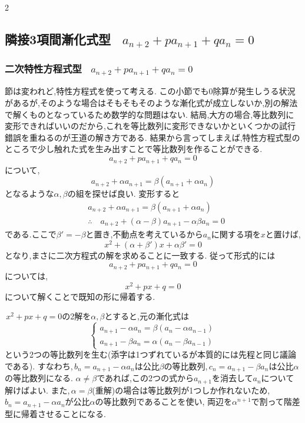 \documentclass[dvipdfmx,a4paper,11pt,fleqn,openany]{jsbook}
\begin{document}
\begin{multicols*}{2}
\begin{quote}
    \end{quote}

  \subsection{隣接3項間漸化式型 \, $\displaystyle a_{n+2}+pa_{n+1}+qa_n=0$}
    \subsubsection{二次特性方程式型 \, $\displaystyle a_{n+2}+pa_{n+1}+qa_n=0$}
      節は変われど,特性方程式を使って考える.
      この小節でも0除算が発生しうる状況があるが,そのような場合はそもそもそのような漸化式が成立しないか,別の解法で解くものとなっているため数学的な問題はない.
      結局,大方の場合,等比数列に変形できればいいのだから,これを等比数列に変形できないかといくつかの試行錯誤を重ねるのが王道の解き方である.
      結果から言ってしまえば,特性方程式型のところで少し触れた式を生み出すことで等比数列を作ることができる.
      \[
        a_{n+2}+pa_{n+1}+qa_n=0
      \]
      について,
      \[
        a_{n+2}+\alpha a_{n+1}=\beta(a_{n+1}+\alpha a_{n})
      \]
      となるような$\alpha,\beta$の組を探せば良い.
      変形すると
      \begin{align*}
        &a_{n+2}+\alpha a_{n+1}=\beta(a_{n+1}+\alpha a_{n})\\
        &\therefore \quad a_{n+2}+(\alpha-\beta)a_{n+1}-\alpha\beta a_n=0
      \end{align*}
      である.ここで$\beta'=-\beta$と置き,不動点を考えているから$a_n$に関する項を$x$と置けば,
      \[
        x^2+(\alpha+\beta')x+\alpha\beta'=0      
      \]
      となり,まさに二次方程式の解を求めることに一致する.
      従って形式的には
      \[
        a_{n+2}+pa_{n+1}+qa_n=0
      \]
      については,
      \[
        x^2+px+q=0
      \]
      について解くことで既知の形に帰着する.

      \,$x^2+px+q=0$の2解を$\alpha,\beta$とすると,元の漸化式は
      \[
        \begin{cases}
          a_{n+1}-\alpha a_n=\beta(a_n-\alpha a_{n-1})\\
          a_{n+1}-\beta a_n=\alpha(a_n-\beta a_{n-1})
        \end{cases}
      \]
      という2つの等比数列を生む(添字は1つずれているが本質的には先程と同じ議論である).
      すなわち,\,$b_n=a_{n+1}-\alpha a_n$は公比$\beta$の等比数列,\,$c_n=a_{n+1}-\beta a_n$は公比$\alpha$の等比数列になる.
      $\alpha\ne\beta$であれば,この2つの式から$a_{n+1}$を消去して$a_n$について解けばよい.
      また,\,$\alpha=\beta$(重解)の場合は等比数列が1つしか作れないため,\,$b_n=a_{n+1}-\alpha a_n$が公比$\alpha$の等比数列であることを使い,
      両辺を$\alpha^{n+1}$で割って階差型に帰着させることになる.


\end{multicols*}
\end{document}

